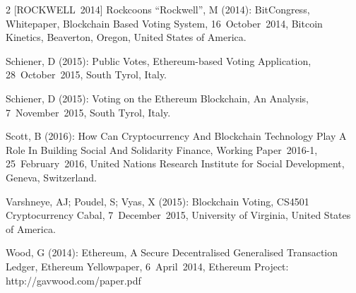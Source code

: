 \documentclass[9pt,oneside]{amsart}
\begin{document}
\begin{multicols}{2}
[ROCKWELL~2014] Rockcoons \enquote{Rockwell}, M (2014): BitCongress, Whitepaper, Blockchain Based Voting System, 16~October~2014, Bitcoin Kinetics, Beaverton, Oregon, United States of America.\par
[SCHIENER~2015A] Schiener, D (2015): Public Votes, Ethereum-based Voting Application, 28~October~2015, South Tyrol, Italy.\par
[SCHIENER~2015B] Schiener, D (2015): Voting on the Ethereum Blockchain, An Analysis, 7~November~2015, South Tyrol, Italy.\par
[SCOTT~2016] Scott, B (2016): How Can Cryptocurrency And Blockchain Technology Play A Role In Building Social And Solidarity Finance, Working Paper~2016-1, 25~February~2016, United Nations Research Institute for Social Development, Geneva, Switzerland.\par
[VARSHNEYA~et~al.~2015] Varshneye, AJ; Poudel, S; Vyas, X (2015): Blockchain Voting, CS4501 Cryptocurrency Cabal, 7~December~2015, University of Virginia, United States of America.\par
[WOOD~2014] Wood, G (2014): Ethereum, A Secure Decentralised Generalised Transaction Ledger, Ethereum Yellowpaper, 6~April~2014, Ethereum Project: http://gavwood.com/paper.pdf

\end{multicols}
\end{document}
